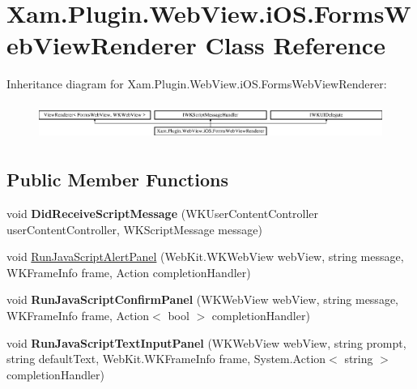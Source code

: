 \hypertarget{class_xam_1_1_plugin_1_1_web_view_1_1i_o_s_1_1_forms_web_view_renderer}{}\section{Xam.\+Plugin.\+Web\+View.\+i\+O\+S.\+Forms\+Web\+View\+Renderer Class Reference}
\label{class_xam_1_1_plugin_1_1_web_view_1_1i_o_s_1_1_forms_web_view_renderer}
Inheritance diagram for Xam.\+Plugin.\+Web\+View.\+i\+O\+S.\+Forms\+Web\+View\+Renderer\+:\begin{figure}[H]
\begin{center}
\leavevmode
\includegraphics[height=1.200429cm]{class_xam_1_1_plugin_1_1_web_view_1_1i_o_s_1_1_forms_web_view_renderer}
\end{center}
\end{figure}
\subsection*{Public Member Functions}
\begin{DoxyCompactItemize}
\item 
\mbox{\label{class_xam_1_1_plugin_1_1_web_view_1_1i_o_s_1_1_forms_web_view_renderer_a21c6254bad5e6218e197de2c0123e63f}} 
void {\bfseries Did\+Receive\+Script\+Message} (W\+K\+User\+Content\+Controller user\+Content\+Controller, W\+K\+Script\+Message message)
\item 
void \hyperlink{class_xam_1_1_plugin_1_1_web_view_1_1i_o_s_1_1_forms_web_view_renderer_a74b08686bd11dcc71f52cd9908205c0a}{Run\+Java\+Script\+Alert\+Panel} (Web\+Kit.\+W\+K\+Web\+View web\+View, string message, W\+K\+Frame\+Info frame, Action completion\+Handler)
\item 
\mbox{\label{class_xam_1_1_plugin_1_1_web_view_1_1i_o_s_1_1_forms_web_view_renderer_a8d35a71e808f43272f62b6cb52d8061b}} 
void {\bfseries Run\+Java\+Script\+Confirm\+Panel} (W\+K\+Web\+View web\+View, string message, W\+K\+Frame\+Info frame, Action$<$ bool $>$ completion\+Handler)
\item 
\mbox{\label{class_xam_1_1_plugin_1_1_web_view_1_1i_o_s_1_1_forms_web_view_renderer_a1323811a64f65d9f7ed261bfc0183660}} 
void {\bfseries Run\+Java\+Script\+Text\+Input\+Panel} (W\+K\+Web\+View web\+View, string prompt, string default\+Text, Web\+Kit.\+W\+K\+Frame\+Info frame, System.\+Action$<$ string $>$ completion\+Handler)
\end{DoxyCompactItemize}

